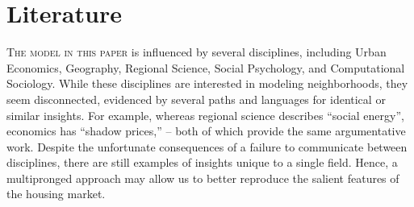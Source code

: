 \begin{savequote}[75mm]
\end{savequote}

\chapter{Literature}

{\lettrine[lines=3,slope=1pt,nindent=1pt,]{\textcolor{SchoolColor}{T}}{he model in this paper} is influenced by several disciplines, including Urban Economics, Geography, Regional Science, Social Psychology, and Computational Sociology. While these disciplines are interested in modeling neighborhoods, they seem disconnected, evidenced by several paths and languages for identical or similar insights. For example, whereas regional science describes ``social energy''\cite{isard72}, economics has ``shadow prices,'' -- both of which provide the same argumentative work. Despite the unfortunate consequences of a failure to communicate between disciplines, there are still examples of insights unique to a single field. Hence, a multipronged approach may allow us to better reproduce the salient features of the housing market.

}
